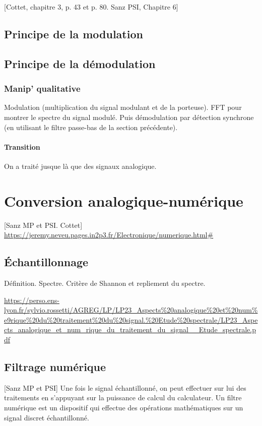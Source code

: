 \documentclass[11pt]{report}
\numberwithin{figure}{section}
\numberwithin{equation}{section}
\numberwithin{table}{section}
\newcommand{\1}{\boldsymbol{1}}
\begin{document}
[Cottet, chapitre 3, p. 43 et p. 80. Sanz PSI, Chapitre 6]

\subsection{Principe de la modulation}

\subsection{Principe de la démodulation}


\subsubsection{Manip' qualitative} Modulation (multiplication du signal modulant et de la porteuse). FFT pour montrer le spectre du signal modulé. Puis démodulation par détection synchrone (en utilisant le filtre passe-bas de la section précédente).

\paragraph{Transition} On a traité jusque là que des signaux analogique.

\section{Conversion analogique-numérique}

[Sanz MP et PSI. Cottet] \url{https://jeremy.neveu.pages.in2p3.fr/Electronique/numerique.html#}

\subsection{Échantillonnage}

Définition. Spectre. Critère de Shannon et repliement du spectre.

\url{https://perso.ens-lyon.fr/sylvio.rossetti/AGREG/LP/LP23_Aspects%20analogique%20et%20num%e9rique%20du%20traitement%20du%20signal.%20Etude%20spectrale/LP23_Aspects_analogique_et_num_rique_du_traitement_du_signal__Etude_spectrale.pdf}

\subsection{Filtrage numérique}

[Sanz MP et PSI] Une fois le signal échantillonné, on peut effectuer sur lui des traitements en s’appuyant sur la
puissance de calcul du calculateur. Un filtre numérique est un dispositif qui effectue des opérations mathématiques sur un signal discret échantillonné.
\end{document}
